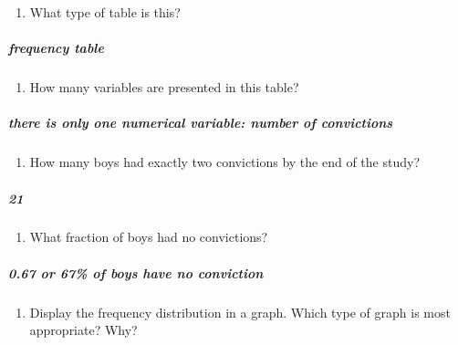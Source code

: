 \documentclass[]{article}
\providecommand{\tightlist}{%
  \setlength{\itemsep}{0pt}\setlength{\parskip}{0pt}}
\let\oldsubparagraph\subparagraph
\renewcommand{\subparagraph}[1]{\oldsubparagraph{#1}\mbox{}}
\begin{document}
\begin{enumerate}
\def\labelenumi{\alph{enumi}.}
\tightlist
\item
  What type of table is this?
\end{enumerate}

\subparagraph{frequency table}\label{frequency-table}

\begin{enumerate}
\def\labelenumi{\alph{enumi}.}
\setcounter{enumi}{1}
\tightlist
\item
  How many variables are presented in this table?
\end{enumerate}

\subparagraph{there is only one numerical variable: number of
convictions}\label{there-is-only-one-numerical-variable-number-of-convictions}

\begin{enumerate}
\def\labelenumi{\alph{enumi}.}
\setcounter{enumi}{2}
\tightlist
\item
  How many boys had exactly two convictions by the end of the study?
\end{enumerate}

\subparagraph{21}\label{section-5}

\begin{enumerate}
\def\labelenumi{\alph{enumi}.}
\setcounter{enumi}{3}
\tightlist
\item
  What fraction of boys had no convictions?
\end{enumerate}

\subparagraph{0.67 or 67\% of boys have no
conviction}\label{or-67-of-boys-have-no-conviction}

\begin{enumerate}
\def\labelenumi{\alph{enumi}.}
\setcounter{enumi}{4}
\tightlist
\item
  Display the frequency distribution in a graph. Which type of graph is
  most appropriate? Why?
\end{enumerate}
\end{document}
